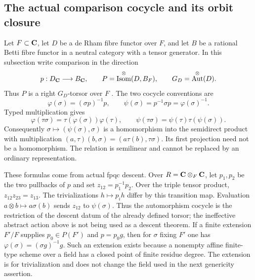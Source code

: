 \documentclass[11pt]{article}
\theoremstyle{definition}\newtheorem{definition}[theorem]{Definition}
\theoremstyle{remark}\newtheorem{remark}[theorem]{Remark}
\DeclareMathOperator{\Aut}{Aut}\DeclareMathOperator{\Isom}{Isom}
\begin{document}
\subsection{The actual comparison cocycle and its orbit closure}
Let $F\subset\mathbf C$, let $D$ be a de Rham fibre functor over $F$, and let $B$ be a rational Betti fibre functor in a neutral category with a tensor generator. In this subsection write comparison in the direction
\[
 p:D_\C\longrightarrow B_\C,\qquad
 P=\Isom^\otimes(D,B_F),\qquad G_D=\Aut^\otimes(D).
\]
Thus $P$ is a right $G_D$-torsor over $F$ \cite[Theorem~3.2, p.~31]{DeligneMilne}. The two cocycle conventions are
\[
 \varphi(\sigma)=(\sigma p)^{-1}p,\qquad
 \psi(\sigma)=p^{-1}\sigma p=\varphi(\sigma)^{-1}.
\]
Typed multiplication gives
\[
 \varphi(\tau\sigma)=\tau(\varphi(\sigma))\varphi(\tau),
 \qquad
 \psi(\tau\sigma)=\psi(\tau)\tau(\psi(\sigma)).
\]
Consequently $\sigma\mapsto(\psi(\sigma),\sigma)$ is a homomorphism into the semidirect product with multiplication $(a,\tau)(b,\sigma)=(a\tau(b),\tau\sigma)$. Its first projection need not be a homomorphism. The relation is semilinear and cannot be replaced by an ordinary representation.

These formulas come from actual fpqc descent. Over $R=\mathbf C\otimes_F\mathbf C$, let $p_1,p_2$ be the two pullbacks of $p$ and set $z_{12}=p_1^{-1}p_2$. Over the triple tensor product,
$z_{12}z_{23}=z_{13}$. The trivializations $h\mapsto p_i h$ differ by this transition map. Evaluation $a\otimes b\mapsto a\sigma(b)$ sends $z_{12}$ to $\psi(\sigma)$. Thus the automorphism cocycle is the restriction of the descent datum of the already defined torsor; the ineffective abstract action above is not being used as a descent theorem. If a finite extension $F'/F$ supplies $p_0\in P(F')$ and $p=p_0g$, then for $\sigma$ fixing $F'$ one has $\varphi(\sigma)=(\sigma g)^{-1}g$. Such an extension exists because a nonempty affine finite-type scheme over a field has a closed point of finite residue degree. The extension is for trivialization and does not change the field used in the next genericity assertion.
\end{document}
